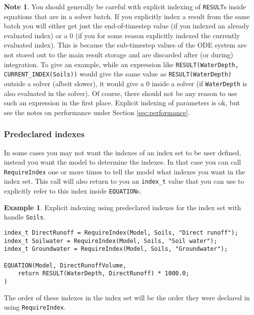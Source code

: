 \documentclass[11pt]{article}
\theoremstyle{definition}
\newtheorem{mynote}{Note}
\newenvironment{note}%
  {\begin{lrbox}{\notebox}%
   \begin{minipage}{\dimexpr\linewidth-2\fboxsep}
   \begin{mynote}}%
  {\end{mynote}%
   \end{minipage}%
   \end{lrbox}%
   \begin{trivlist}
     \item[]\colorbox{silver}{\usebox\notebox}
   \end{trivlist}}
\newtheorem{myexample}{Example}
\newenvironment{example}%
  {\begin{lrbox}{\examplebox}%
   \begin{minipage}{\dimexpr\linewidth-2\fboxsep}
   \begin{myexample}}%
  {\end{myexample}%
   \end{minipage}%
   \end{lrbox}%
   \begin{trivlist}
     \item[]\colorbox{silver}{\usebox\examplebox}
   \end{trivlist}}
\begin{document}
\begin{note}
You should generally be careful with explicit indexing of {\tt RESULT}s inside equations that are in a solver batch. If you explicitly index a result from the same batch you will either get just the end-of-timestep value (if you indexed an already evaluated index) or a 0 (if you for some reason explicitly indexed the currently evaluated index). This is because the sub-timestep values of the ODE system are not stored out to the main result storage and are discarded after (or during) integration. To give an example, while an expression like {\tt RESULT(WaterDepth, CURRENT\_INDEX(Soils))} would give the same value as {\tt RESULT(WaterDepth)} outside a solver (albeit slower), it would give a 0 inside a solver (if {\tt WaterDepth} is also evaluated in the solver). Of course, there should not be any reason to use such an expression in the first place. Explicit indexing of parameters is ok, but see the notes on performance under Section \ref{sec:performance}.
\end{note}

\subsubsection{Predeclared indexes}\label{sec:predeclared}

In some cases you may not want the indexes of an index set to be user defined, instead you want the model to determine the indexes. In that case you can call {\tt RequireIndex} one or more times to tell the model what indexes you want in the index set. This call will also return to you an {\tt index\_t} value that you can use to explicitly refer to this index inside {\tt EQUATION}s.

\begin{example}
Explicit indexing using predeclared indexes for the index set with handle {\tt Soils}.
\begin{lstlisting}[style=mycpp]
index_t DirectRunoff = RequireIndex(Model, Soils, "Direct runoff");
index_t Soilwater = RequireIndex(Model, Soils, "Soil water");
index_t Groundwater = RequireIndex(Model, Soils, "Groundwater");

EQUATION(Model, DirectRunoffVolume,
	return RESULT(WaterDepth, DirectRunoff) * 1000.0;
)
\end{lstlisting}
\end{example}

The order of these indexes in the index set will be the order they were declared in using {\tt RequireIndex}.
\end{document}
